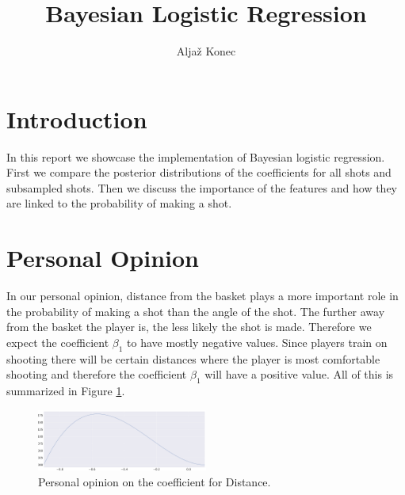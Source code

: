 \documentclass[9pt]{IEEEtran}
\title{\vspace{0ex} Bayesian Logistic Regression}
\author{Aljaž Konec\vspace{-4.0ex}}
\begin{document}
\maketitle

\section{Introduction}
In this report we showcase the implementation of Bayesian logistic regression. 
First we compare the posterior distributions of the coefficients for all shots and subsampled shots.
Then we discuss the importance of the features and how they are linked to the probability of making a shot.

\section{Personal Opinion}
In our personal opinion, distance from the basket plays a more important role in the probability of making a shot than the angle of the shot.
The further away from the basket the player is, the less likely the shot is made.
Therefore we expect the coefficient $\beta_1$ to have mostly negative values.
Since players train on shooting there will be certain distances where the player is most comfortable shooting and therefore the coefficient $\beta_1$ will have a positive value.
All of this is summarized in Figure \ref{fig:personal_opinion}.
\begin{figure}[H]
    \centering
    \includegraphics[width=0.5\textwidth]{personal_opinion.pdf}
    \caption{Personal opinion on the coefficient for Distance.}
    \label{fig:personal_opinion}
\end{figure}
\end{document}
